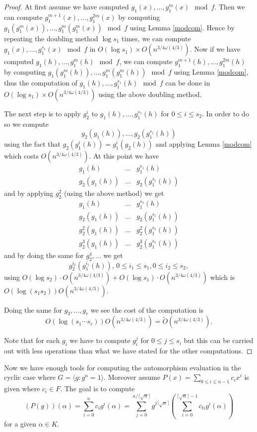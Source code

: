 \documentclass[sigconf]{acmart}
\newcommand{\osumcost}{O(n^{3/4 \omega(4/3)})}
\newcommand{\osumcosttilde}{\tilde{O}(n^{3/4 \omega(4/3)})}
\theoremstyle{acmplain}
\begin{document}
\begin{proof}
At first assume we have computed $g_1(x), \ldots , g_1^m(x) \mod f$. Then we can compute $g_1^{m+1}(x), \ldots , g_1^{2m}(x)$ by
computing $g_1(g_1^m(x)), \ldots , g_1^m(g_1^m(x)) \mod f$ using Lemma \ref{modcom}. Hence by repeating the doubling method 
$\log s_1$ times, we can compute $g_1(x), \ldots , g_1^{s_1}(x) \mod f$ in $O(\log s_1) \times \osumcost$. Now if we have computed $g_1(h), \ldots , g_1^m(h) \mod f$, we can compute \newline $g_1^{m+1}(h), \ldots , g_1^{2m}(h)$ by computing $g_1(g_1^m(h)), \ldots , g_1^m(g_1^m(h)) \mod f$ using Lemma \ref{modcom}, thus the computation of $g_1(h), \ldots , g_1^{s_1}(h) \mod f$ can be done in $ O(\log s_1) \times \osumcost$ using the above doubling method.

The next step is to apply $g_2^i$ to $g_1(h), \ldots , g_1^{s_1}(h)$ for $0\leq i \leq s_2$. In order to do so we compute 
$$g_2(g_1(h)), \ldots , g_2(g_1^{s_1}(h))$$
using the fact that $g_2(g_1^i(h)) = g_1^i(g_2(h))$ and applying Lemma \ref{modcom} which costs $\osumcost$. At this point we have 
$$\begin{array}{lll} g_1(h)& \ldots & g_1^{s_1}(h)\\ g_2(g_1(h))& \ldots & g_2(g_1^{s_1}(h))\end{array}$$
and by applying $g_2^2$ (using the above method) we get 
$$\begin{array}{lll} g_1(h)& \ldots & g_1^{s_1}(h)\\ g_2(g_1(h))& \ldots & g_2(g_1^{s_1}(h))\\
g_2^2(g_1(h))& \ldots & g_2^2(g_1^{s_1}(h))\\g_2^3(g_1(h))& \ldots & g_2^3(g_1^{s_1}(h))
\end{array}$$
and by doing the same for $g_2^4, \ldots $ we get
$$g_2^{i_2}(g_1^{i_1}(h)), \, 0\leq i_1\leq s_1, 0 \leq i_2 \leq s_2,$$
using $O(\log s_2)\cdot \osumcost + O(\log s_1)\cdot \osumcost$ which is  $O(\log (s_1s_2))\osumcost$. 

Doing the same for $g_3 , \ldots , g_r$ we see the cost of the computation is 
$$O(\log (s_1\cdots s_r))\osumcost = \osumcosttilde.$$

Note that for each $g_i$ we have to compute $g_i^j$ for $0 \leq j \leq s_i$ but this can be carried out with less operations than what 
we have stated for the other computations.
\end{proof}


Now we have enough tools for computing the automorphism evaluation in the cyclic case where $G = \langle g: g^n =1 \rangle$. 
Moreover assume $P(x) = \sum_{0 \leq i \leq n-1} c_ix^i$ is given where $c_i \in F$. The goal is to compute 
$$(P(g))(\alpha) = \sum_{i = 0}^{n} c_i g^i(\alpha) = \sum_{j = 0}^{n/\lceil \sqrt{n} \rceil} 
g^{j\lceil \sqrt{n} \rceil}(\sum_{i= 0}^{\lceil \sqrt{n} \rceil -1} c_{ti} g^i(\alpha)) $$
for a given $\alpha \in K$.  
\end{document}
